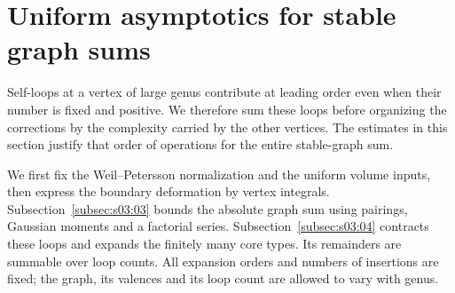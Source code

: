 \section{Uniform asymptotics for stable graph sums}
\label{sec:s03}

Self-loops at a vertex of large genus contribute at leading order even
when their number is fixed and positive. We therefore sum these loops
before organizing the corrections by the complexity carried by the other
vertices. The estimates in this section justify that order of operations
for the entire stable-graph sum.

We first fix the Weil--Petersson normalization and the uniform volume
inputs, then express the boundary deformation by vertex integrals.
Subsection~\ref{subsec:s03:03} bounds the absolute graph sum using
pairings, Gaussian moments and a factorial series.
Subsection~\ref{subsec:s03:04} contracts these loops and expands the
finitely many core types. Its remainders are summable over loop counts.
All expansion orders and numbers of insertions are fixed;
the graph, its valences and its loop count are allowed to vary with genus.





